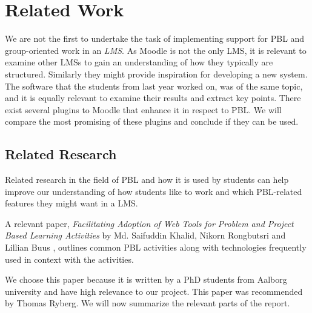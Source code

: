 \chapter{Related Work}
\label{chap:relatedwork}
We are not the first to undertake the task of implementing support for PBL and group-oriented work in an \textit{LMS}. 
As Moodle is not the only LMS, it is relevant to examine other LMSs to gain an understanding of how they typically are structured. 
Similarly they might provide inspiration for developing a new system.
The software that the students from last year worked on, was of the same topic, and it is equally relevant to examine their results and extract key points.
There exist several plugins to Moodle that enhance it in respect to PBL. 
We will compare the most promising of these plugins and conclude if they can be used.

\section{Related Research}
\label{sec:research}
Related research in the field of PBL and how it is used by students can help improve our understanding of how students like to work and which PBL-related features they might want in a LMS.
 
A relevant paper, \textit{Facilitating Adoption of Web Tools for Problem and Project Based Learning Activities} by Md. Saifuddin Khalid, Nikorn Rongbutsri and Lillian Buus \citep{khalidRongbutsriBuus}, outlines common PBL activities along with technologies frequently used in context with the activities.

We choose this paper because it is written by a PhD students from Aalborg university and have high relevance to our project. This paper was recommended by Thomas Ryberg\cite{thomas}. We will now summarize the relevant parts of the report.  


